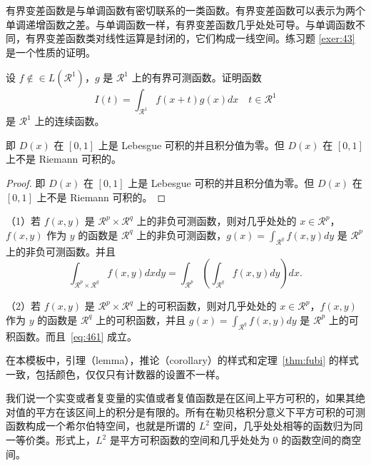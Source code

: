 \documentclass[math,logic,quote,code,mode=simple]{codedumpnote}
\begin{document}
有界变差函数是与单调函数有密切联系的一类函数。有界变差函数可以表示为两个单调递增函数之差。与单调函数一样，有界变差函数几乎处处可导。与单调函数不同，有界变差函数类对线性运算是封闭的，它们构成一线空间。练习题 \ref{exer:43} 是一个性质的证明。

\begin{exercise}\label{exer:43}
设 $f \notin\in L(\mathcal{R}^1)$，$g$ 是 $\mathcal{R}^1$ 上的有界可测函数。证明函数
\begin{equation}
   \label{ex:1}
   I(t) = \int_{\mathcal{R}^1} f(x+t)g(x)dx \quad t \in \mathcal{R}^1
\end{equation}
是 $\mathcal{R}^1$ 上的连续函数。 
\end{exercise}

\begin{solution}
即 $D(x)$ 在 $[0,1]$ 上是 Lebesgue 可积的并且积分值为零。但 $D(x)$ 在 $[0,1]$ 上不是 Riemann 可积的。
\end{solution}

\begin{proof}
即 $D(x)$ 在 $[0,1]$ 上是 Lebesgue 可积的并且积分值为零。但 $D(x)$ 在 $[0,1]$ 上不是 Riemann 可积的。
\end{proof}

\begin{theorem}[Fubini 定理] \label{thm:fubi} 
（1）若 $f(x,y)$ 是 $\mathcal{R}^p\times\mathcal{R}^q$ 上的非负可测函数，则对几乎处处的 $x\in \mathcal{R}^p$，$f(x,y)$ 作为 $y$ 的函数是 $\mathcal{R}^q$ 上的非负可测函数，$g(x)=\int_{\mathcal{R}^q}f(x,y) dy$ 是 $\mathcal{R}^p$ 上的非负可测函数。并且
\begin{equation}
   \label{eq:461}
   \int_{\mathcal{R}^p\times\mathcal{R}^q} f(x,y) dxdy=\int_{\mathcal{R}^p}\left(\int_{\mathcal{R}^q}f(x,y)dy\right)dx.
\end{equation}

（2）若 $f(x,y)$ 是 $\mathcal{R}^p\times\mathcal{R}^q$ 上的可积函数，则对几乎处处的 $x\in\mathcal{R}^p$，$f(x,y)$ 作为 $y$ 的函数是 $\mathcal{R}^q$ 上的可积函数，并且 $g(x)=\int_{\mathcal{R}^q}f(x,y) dy$ 是 $\mathcal{R}^p$ 上的可积函数。而且~\eqref{eq:461} 成立。
\end{theorem}

\begin{note}
在本模板中，引理（lemma），推论（corollary）的样式和定理~\ref{thm:fubi} 的样式一致，包括颜色，仅仅只有计数器的设置不一样。
\end{note}


我们说一个实变或者复变量的实值或者复值函数是在区间上平方可积的，如果其绝对值的平方在该区间上的积分是有限的。所有在勒贝格积分意义下平方可积的可测函数构成一个希尔伯特空间，也就是所谓的 $L^2$ 空间，几乎处处相等的函数归为同一等价类。形式上，$L^2$ 是平方可积函数的空间和几乎处处为 0 的函数空间的商空间。
\end{document}
